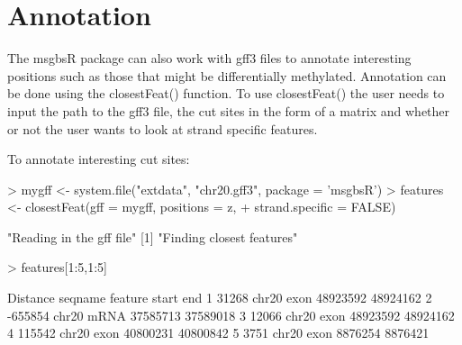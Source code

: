\documentclass{article}
\begin{document}
\clearpage

\section{Annotation}

The msgbsR package can also work with gff3 files to annotate interesting positions such as those that might be differentially methylated. Annotation can be done using the closestFeat() function. To use closestFeat() the user needs to input the path to the gff3 file, the cut sites in the form of a matrix and whether or not the user wants to look at strand specific features.

To annotate interesting cut sites:
\begin{Schunk}
\begin{Sinput}
> mygff <- system.file("extdata", "chr20.gff3", package = 'msgbsR')
> features <- closestFeat(gff = mygff, positions = z,
+                         strand.specific = FALSE)
\end{Sinput}
\begin{Soutput}
[1] "Reading in the gff file"
[1] "Finding closest features"
\end{Soutput}
\begin{Sinput}
> features[1:5,1:5]
\end{Sinput}
\begin{Soutput}
  Distance seqname feature    start      end
1    31268   chr20    exon 48923592 48924162
2  -655854   chr20    mRNA 37585713 37589018
3    12066   chr20    exon 48923592 48924162
4   115542   chr20    exon 40800231 40800842
5     3751   chr20    exon  8876254  8876421
\end{Soutput}
\end{Schunk}
\end{document}

